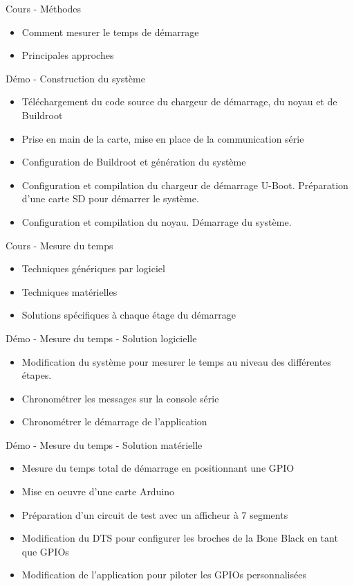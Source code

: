 \documentclass[a4paper,12pt,obeyspaces,spaces,hyphens]{article}
\begin{document}
\feagendatwocolumn
{Cours - Méthodes}
{
  \begin{itemize}
  \item Comment mesurer le temps de démarrage
  \item Principales approches
  \end{itemize}
}
{Démo - Construction du système}
{
 \begin{itemize}
 \item Téléchargement du code source du chargeur de démarrage, du noyau et de Buildroot
 \item Prise en main de la carte, mise en place de la communication série
 \item Configuration de Buildroot et génération du système
 \item Configuration et compilation du chargeur de démarrage U-Boot. Préparation d'une
       carte SD pour démarrer le système.
 \item Configuration et compilation du noyau. Démarrage du système.
 \end{itemize}
}

\feagendatwocolumn
{Cours - Mesure du temps}
{
  \begin{itemize}
  \item Techniques génériques par logiciel
  \item Techniques matérielles
  \item Solutions spécifiques à chaque étage du démarrage
  \end{itemize}
}
{Démo - Mesure du temps - Solution logicielle}
{
 \begin{itemize}
 \item Modification du système pour mesurer le temps au niveau des différentes étapes.
 \item Chronométrer les messages sur la console série
 \item Chronométrer le démarrage de l'application
 \end{itemize}
}

\feagendaonecolumn
{Démo - Mesure du temps - Solution matérielle}
{
  \begin{itemize}
  \item Mesure du temps total de démarrage en positionnant une GPIO
  \item Mise en oeuvre d'une carte Arduino
  \item Préparation d'un circuit de test avec un afficheur à 7 segments
  \item Modification du DTS pour configurer les broches de la Bone Black en tant que GPIOs
  \item Modification de l'application pour piloter les GPIOs personnalisées
  \end{itemize}
}
\end{document}
